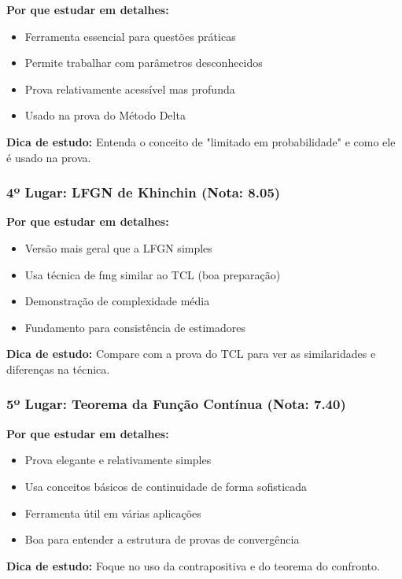 \documentclass[12pt,a4paper]{article}
\theoremstyle{plain}
\theoremstyle{definition}
\theoremstyle{remark}
\begin{document}
\textbf{Por que estudar em detalhes:}
\begin{itemize}
    \item Ferramenta essencial para questões práticas
    \item Permite trabalhar com parâmetros desconhecidos
    \item Prova relativamente acessível mas profunda
    \item Usado na prova do Método Delta
\end{itemize}

\textbf{Dica de estudo:} Entenda o conceito de "limitado em probabilidade" e como ele é usado na prova.

\subsubsection{4º Lugar: LFGN de Khinchin (Nota: 8.05)}

\textbf{Por que estudar em detalhes:}
\begin{itemize}
    \item Versão mais geral que a LFGN simples
    \item Usa técnica de fmg similar ao TCL (boa preparação)
    \item Demonstração de complexidade média
    \item Fundamento para consistência de estimadores
\end{itemize}

\textbf{Dica de estudo:} Compare com a prova do TCL para ver as similaridades e diferenças na técnica.

\subsubsection{5º Lugar: Teorema da Função Contínua (Nota: 7.40)}

\textbf{Por que estudar em detalhes:}
\begin{itemize}
    \item Prova elegante e relativamente simples
    \item Usa conceitos básicos de continuidade de forma sofisticada
    \item Ferramenta útil em várias aplicações
    \item Boa para entender a estrutura de provas de convergência
\end{itemize}

\textbf{Dica de estudo:} Foque no uso da contrapositiva e do teorema do confronto.
\end{document}
